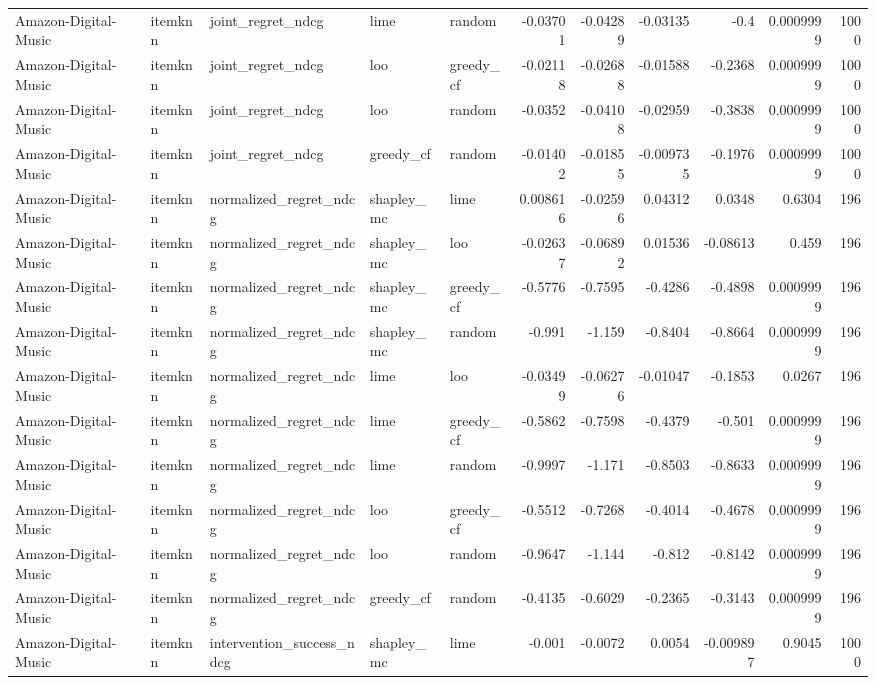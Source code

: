 \begin{table}[t]
\begin{tabular}{lllllrrrrrr}
Amazon-Digital-Music & itemknn & joint\_regret\_ndcg & lime & random & -0.03701 & -0.04289 & -0.03135 & -0.4 & 0.0009999 & 1000 \\
Amazon-Digital-Music & itemknn & joint\_regret\_ndcg & loo & greedy\_cf & -0.02118 & -0.02688 & -0.01588 & -0.2368 & 0.0009999 & 1000 \\
Amazon-Digital-Music & itemknn & joint\_regret\_ndcg & loo & random & -0.0352 & -0.04108 & -0.02959 & -0.3838 & 0.0009999 & 1000 \\
Amazon-Digital-Music & itemknn & joint\_regret\_ndcg & greedy\_cf & random & -0.01402 & -0.01855 & -0.009735 & -0.1976 & 0.0009999 & 1000 \\
Amazon-Digital-Music & itemknn & normalized\_regret\_ndcg & shapley\_mc & lime & 0.008616 & -0.02596 & 0.04312 & 0.0348 & 0.6304 & 196 \\
Amazon-Digital-Music & itemknn & normalized\_regret\_ndcg & shapley\_mc & loo & -0.02637 & -0.06892 & 0.01536 & -0.08613 & 0.459 & 196 \\
Amazon-Digital-Music & itemknn & normalized\_regret\_ndcg & shapley\_mc & greedy\_cf & -0.5776 & -0.7595 & -0.4286 & -0.4898 & 0.0009999 & 196 \\
Amazon-Digital-Music & itemknn & normalized\_regret\_ndcg & shapley\_mc & random & -0.991 & -1.159 & -0.8404 & -0.8664 & 0.0009999 & 196 \\
Amazon-Digital-Music & itemknn & normalized\_regret\_ndcg & lime & loo & -0.03499 & -0.06276 & -0.01047 & -0.1853 & 0.0267 & 196 \\
Amazon-Digital-Music & itemknn & normalized\_regret\_ndcg & lime & greedy\_cf & -0.5862 & -0.7598 & -0.4379 & -0.501 & 0.0009999 & 196 \\
Amazon-Digital-Music & itemknn & normalized\_regret\_ndcg & lime & random & -0.9997 & -1.171 & -0.8503 & -0.8633 & 0.0009999 & 196 \\
Amazon-Digital-Music & itemknn & normalized\_regret\_ndcg & loo & greedy\_cf & -0.5512 & -0.7268 & -0.4014 & -0.4678 & 0.0009999 & 196 \\
Amazon-Digital-Music & itemknn & normalized\_regret\_ndcg & loo & random & -0.9647 & -1.144 & -0.812 & -0.8142 & 0.0009999 & 196 \\
Amazon-Digital-Music & itemknn & normalized\_regret\_ndcg & greedy\_cf & random & -0.4135 & -0.6029 & -0.2365 & -0.3143 & 0.0009999 & 196 \\
Amazon-Digital-Music & itemknn & intervention\_success\_ndcg & shapley\_mc & lime & -0.001 & -0.0072 & 0.0054 & -0.009897 & 0.9045 & 1000 \\

\end{tabular}
\end{table}
